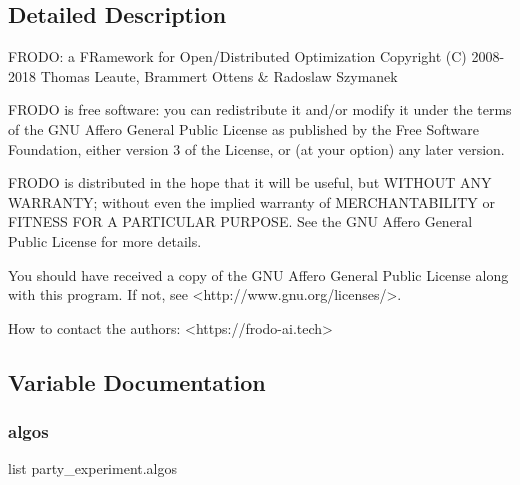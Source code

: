 \subsection{Detailed Description}
\begin{DoxyVerb}FRODO: a FRamework for Open/Distributed Optimization
Copyright (C) 2008-2018  Thomas Leaute, Brammert Ottens & Radoslaw Szymanek

FRODO is free software: you can redistribute it and/or modify
it under the terms of the GNU Affero General Public License as published by
the Free Software Foundation, either version 3 of the License, or
(at your option) any later version.

FRODO is distributed in the hope that it will be useful,
but WITHOUT ANY WARRANTY; without even the implied warranty of
MERCHANTABILITY or FITNESS FOR A PARTICULAR PURPOSE.  See the
GNU Affero General Public License for more details.

You should have received a copy of the GNU Affero General Public License
along with this program.  If not, see <http://www.gnu.org/licenses/>.


How to contact the authors: 
<https://frodo-ai.tech>
\end{DoxyVerb}
 

\subsection{Variable Documentation}
\mbox{\label{namespaceparty__experiment_abce4cc8c36f7a780c5e01d91fe9f79a8}} 
\subsubsection{\texorpdfstring{algos}{algos}}
{\footnotesize\ttfamily list party\+\_\+experiment.\+algos}

